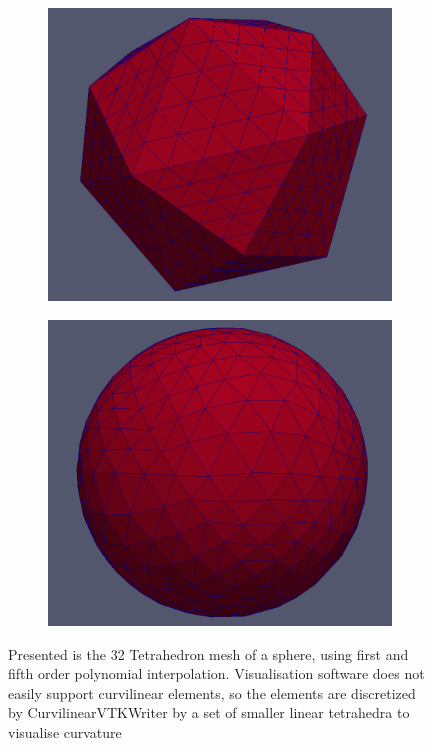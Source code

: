 \begin{figure}
    \centering
	\begin{subfigure}[b]{0.48\textwidth} \hspace{8mm} \includegraphics[scale=0.215]{images/sphere32discr6ord1} \end{subfigure}
	\begin{subfigure}[b]{0.48\textwidth} \includegraphics[scale=0.2]{images/sphere32discr6ord5} \end{subfigure}
	\captionsetup{width=0.8\textwidth} 
	\caption{Presented is the 32 Tetrahedron mesh of a sphere, using first and fifth order polynomial interpolation. Visualisation software does not easily support curvilinear elements, so the elements are discretized by CurvilinearVTKWriter by a set of smaller linear tetrahedra to visualise curvature }
	\label{fig:result:spherecurv}
\end{figure}

